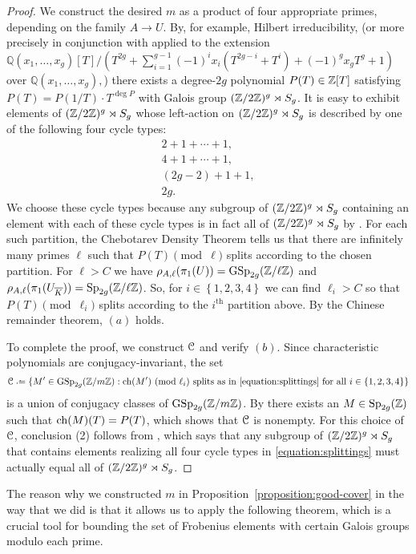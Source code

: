 	\begin{proof}
We construct the desired $m$ as a product of four appropriate primes,
depending on the family $A \to U$.
By, for example, Hilbert irreducibility, (or more precisely \cite[\S 9.2, Proposition 1]{serre1989lectures} in conjunction with \cite[\S 13.1, Theorem 3]{serre1989lectures} applied to the extension $\mathbb Q(x_1, \ldots, x_g)[T]/(T^{2g} + \sum_{i=1}^{g-1} (-1)^i x_i (T^{2g-i} + T^i) + (-1)^g x_g T^g + 1)$ over $\mathbb Q(x_1, \ldots, x_g),$) there exists a degree-$2g$ polynomial $P(T) \in {\mathbb Z}[T]$ satisfying $P(T) = P(1/T) \cdot T^{\deg P}$ with Galois group $({\mathbb Z}/2{\mathbb Z})^g \rtimes S_g$.
		It is easy to exhibit elements of $({\mathbb Z}/2{\mathbb Z})^g \rtimes S_g$ whose left-action on $({\mathbb Z}/2{\mathbb Z})^g \rtimes S_g$ is described by one of the following four cycle types:
		\begin{equation} \label{equation:splittings}
			\begin{array}{c}
				2 + 1 + \cdots + 1, \\
				4 + 1 + \cdots + 1, \\
				(2g-2) + 1 + 1, \\
				2g.
			\end{array}
		\end{equation}
We choose these cycle types because any subgroup of $({\mathbb Z}/2{\mathbb Z})^g \rtimes S_g$ containing an element with each of these cycle types is in fact all of $({\mathbb Z}/2{\mathbb Z})^g \rtimes S_g$ by \cite[Lemma 7.1]{kowalski2006large}.
		For each such partition, the Chebotarev Density Theorem tells us that there are infinitely many primes $\ell$ such that $P(T) \pmod{\ell}$ splits according to the chosen partition. For $\ell > C$ we have $\rho_{A, \ell}(\pi_1(U)) = \operatorname{GSp}_{2g}({\mathbb Z} /  \ell \mathbb Z)$ and $\rho_{A, \ell}(\pi_1(U_{\overline{K}})) = \operatorname{Sp}_{2g}({\mathbb Z} /  \ell \mathbb Z)$.
So, for $i \in \left\{ 1,2,3,4 \right\}$ we can find $\ell_i > C$
so that $P(T) \pmod{\ell_i}$ splits according to the $i^{\mathrm{th}}$ partition above. 		
By the Chinese remainder theorem, $(a)$ holds.

To complete the proof, we construct $\mathcal C$ and verify $(b)$.
Since characteristic polynomials are conjugacy-invariant, the set
		\[
			\mc C \defeq \{M' \in \GSp_{2g}(\bz / m \ZZ) : \charpoly(M')\ (\on{mod}\, \ell_i) \text{ splits as in \eqref{equation:splittings} for all $i \in \left\{ 1,2,3,4 \right\}$}\}
		\]
		is a union of conjugacy classes of $\operatorname{GSp}_{2g}({\mathbb Z} /  m \mathbb Z)$. By \cite[Theorem A.1]{rivin2008walks} there exists an $M \in \operatorname{Sp}_{2g}({\mathbb Z})$ such that $\operatorname{ch}(M)(T) = P(T)$, which shows that $\mathcal C$ is nonempty. For this choice of $\mathcal C$, conclusion (2) follows from \cite[Lemma 7.1]{kowalski2006large}, which says that any subgroup of $({\mathbb Z}/2{\mathbb Z})^g \rtimes S_g$ that contains elements realizing all four cycle types in \eqref{equation:splittings} must actually equal all of $({\mathbb Z}/2{\mathbb Z})^g \rtimes S_g$.
	\end{proof}
    The reason why we constructed $m$ in Proposition~\ref{proposition:good-cover} in the way that we did is that it allows us to apply the following theorem, which is a crucial tool for bounding the set of Frobenius elements with certain Galois groups modulo each prime.

